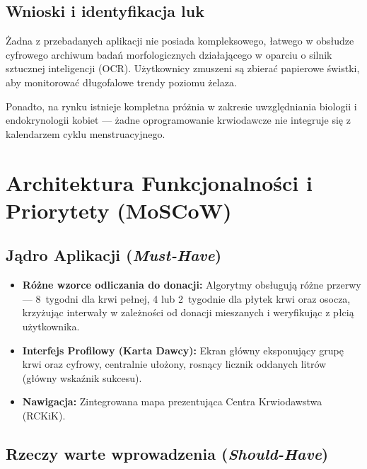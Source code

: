 \documentclass[11pt, a4paper]{article}
\begin{document}
\subsection{Wnioski i identyfikacja luk}

Żadna z przebadanych aplikacji nie posiada kompleksowego, łatwego w obsłudze cyfrowego
archiwum badań morfologicznych działającego w oparciu o silnik sztucznej inteligencji (OCR).
Użytkownicy zmuszeni są zbierać papierowe świstki, aby monitorować długofalowe trendy
poziomu żelaza.

Ponadto, na rynku istnieje kompletna próżnia w zakresie uwzględniania biologii
i endokrynologii kobiet — żadne oprogramowanie krwiodawcze nie integruje się z
kalendarzem cyklu menstruacyjnego.

\section{Architektura Funkcjonalności i Priorytety (MoSCoW)}

\subsection{Jądro Aplikacji (\textit{Must-Have})}

\begin{itemize}
  \item \textbf{Różne wzorce odliczania do donacji:} Algorytmy obsługują różne przerwy —
        8~tygodni dla krwi pełnej, 4 lub 2~tygodnie dla płytek krwi oraz osocza,
        krzyżując interwały w zależności od donacji mieszanych i weryfikując z płcią
        użytkownika.

  \item \textbf{Interfejs Profilowy (Karta Dawcy):} Ekran główny eksponujący grupę krwi
        oraz cyfrowy, centralnie ułożony, rosnący licznik oddanych litrów (główny
        wskaźnik sukcesu).

  \item \textbf{Nawigacja:} Zintegrowana mapa prezentująca Centra Krwiodawstwa (RCKiK).
\end{itemize}

\subsection{Rzeczy warte wprowadzenia (\textit{Should-Have})}
\end{document}
